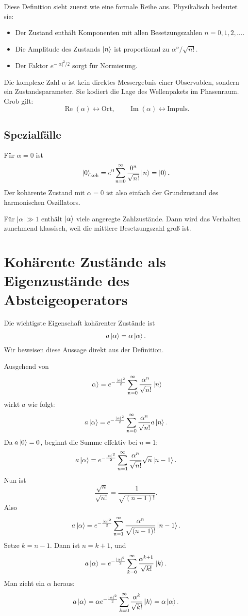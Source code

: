 Diese Definition sieht zuerst wie eine formale Reihe aus. Physikalisch bedeutet sie:
\begin{itemize}
    \item Der Zustand enthält Komponenten mit allen Besetzungszahlen \(n=0,1,2,\dots\).
    \item Die Amplitude des Zustands \(\left|n\right\rangle\) ist proportional zu \(\alpha^n/\sqrt{n!}\).
    \item Der Faktor \(e^{-|\alpha|^2/2}\) sorgt für Normierung.
\end{itemize}

\begin{conceptbox}
Die komplexe Zahl \(\alpha\) ist kein direktes Messergebnis einer Observablen, sondern ein Zustandsparameter. Sie kodiert die Lage des Wellenpakets im Phasenraum. Grob gilt:
\[
    \operatorname{Re}(\alpha) \leftrightarrow \text{Ort},
    \qquad
    \operatorname{Im}(\alpha) \leftrightarrow \text{Impuls}.
\]
\end{conceptbox}

\subsection{Spezialfälle}

Für \(\alpha=0\) ist
\[
    \left|0\right\rangle_{\text{koh}}=e^0\sum_{n=0}^{\infty}\frac{0^n}{\sqrt{n!}}\left|n\right\rangle=\left|0\right\rangle.
\]
Der kohärente Zustand mit \(\alpha=0\) ist also einfach der Grundzustand des harmonischen Oszillators.

Für \(|\alpha|\gg 1\) enthält \(\left|\alpha\right\rangle\) viele angeregte Zahlzustände. Dann wird das Verhalten zunehmend klassisch, weil die mittlere Besetzungszahl groß ist.

\section{Kohärente Zustände als Eigenzustände des Absteigeoperators}

Die wichtigste Eigenschaft kohärenter Zustände ist
\[
    a\left|\alpha\right\rangle=\alpha\left|\alpha\right\rangle.
\]
Wir beweisen diese Aussage direkt aus der Definition.

\begin{derivationbox}
Ausgehend von
\[
    \left|\alpha\right\rangle=e^{-\frac{|\alpha|^2}{2}}
    \sum_{n=0}^{\infty}\frac{\alpha^n}{\sqrt{n!}}\left|n\right\rangle
\]
wirkt \(a\) wie folgt:
\[
    a\left|\alpha\right\rangle
    =e^{-\frac{|\alpha|^2}{2}}
    \sum_{n=0}^{\infty}\frac{\alpha^n}{\sqrt{n!}}a\left|n\right\rangle.
\]
Da \(a\left|0\right\rangle=0\), beginnt die Summe effektiv bei \(n=1\):
\[
    a\left|\alpha\right\rangle
    =e^{-\frac{|\alpha|^2}{2}}
    \sum_{n=1}^{\infty}\frac{\alpha^n}{\sqrt{n!}}\sqrt{n}\left|n-1\right\rangle.
\]
Nun ist
\[
    \frac{\sqrt{n}}{\sqrt{n!}}=\frac{1}{\sqrt{(n-1)!}}.
\]
Also
\[
    a\left|\alpha\right\rangle
    =e^{-\frac{|\alpha|^2}{2}}
    \sum_{n=1}^{\infty}\frac{\alpha^n}{\sqrt{(n-1)!}}\left|n-1\right\rangle.
\]
Setze \(k=n-1\). Dann ist \(n=k+1\), und
\[
    a\left|\alpha\right\rangle
    =e^{-\frac{|\alpha|^2}{2}}
    \sum_{k=0}^{\infty}\frac{\alpha^{k+1}}{\sqrt{k!}}\left|k\right\rangle.
\]
Man zieht ein \(\alpha\) heraus:
\[
    a\left|\alpha\right\rangle
    =\alpha e^{-\frac{|\alpha|^2}{2}}
    \sum_{k=0}^{\infty}\frac{\alpha^k}{\sqrt{k!}}\left|k\right\rangle
    =\alpha\left|\alpha\right\rangle.
\]
\end{derivationbox}

